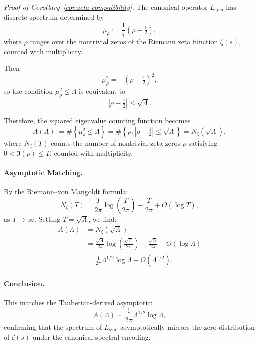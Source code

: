 \begin{proof}[Proof of Corollary~\ref{cor:zeta-compatibility}]
The canonical operator \( L_{\mathrm{sym}} \) has discrete spectrum determined by
\[
\mu_\rho := \frac{1}{i} \left( \rho - \tfrac{1}{2} \right),
\]
where \( \rho \) ranges over the nontrivial zeros of the Riemann zeta function \( \zeta(s) \), counted with multiplicity.

Then
\[
\mu_\rho^2 = -(\rho - \tfrac{1}{2})^2,
\]
so the condition \( \mu_\rho^2 \le \Lambda \) is equivalent to
\[
|\rho - \tfrac{1}{2}| \le \sqrt{\Lambda}.
\]

Therefore, the squared eigenvalue counting function becomes
\[
A(\Lambda) := \#\left\{ \mu_\rho^2 \le \Lambda \right\}
= \#\left\{ \rho : |\rho - \tfrac{1}{2}| \le \sqrt{\Lambda} \right\}
= N_\zeta(\sqrt{\Lambda}),
\]
where \( N_\zeta(T) \) counts the number of nontrivial zeta zeros \( \rho \) satisfying \( 0 < \Im(\rho) \le T \), counted with multiplicity.

\paragraph{Asymptotic Matching.}
By the Riemann--von Mangoldt formula:
\[
N_\zeta(T) = \frac{T}{2\pi} \log\left( \frac{T}{2\pi} \right) - \frac{T}{2\pi} + O(\log T),
\]
as \( T \to \infty \). Setting \( T = \sqrt{\Lambda} \), we find:
\[
\begin{aligned}
A(\Lambda) &= N_\zeta(\sqrt{\Lambda}) \\
&= \frac{\sqrt{\Lambda}}{2\pi} \log\left( \frac{\sqrt{\Lambda}}{2\pi} \right) - \frac{\sqrt{\Lambda}}{2\pi} + O(\log \Lambda) \\
&= \frac{1}{2\pi} \Lambda^{1/2} \log \Lambda + O(\Lambda^{1/2}).
\end{aligned}
\]

\paragraph{Conclusion.}
This matches the Tauberian-derived asymptotic:
\[
A(\Lambda) \sim \frac{1}{2\pi} \Lambda^{1/2} \log \Lambda,
\]
confirming that the spectrum of \( L_{\mathrm{sym}} \) asymptotically mirrors the zero distribution of \( \zeta(s) \) under the canonical spectral encoding.
\end{proof}

